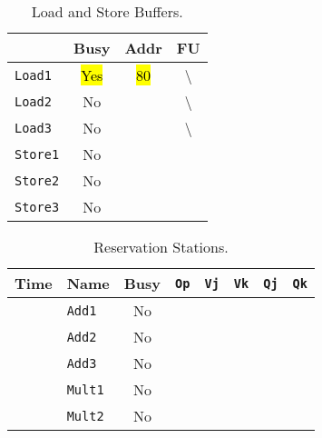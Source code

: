 \begin{enumerate}
    \newpage

    \begin{table}[!htp]
        \centering
        \begin{tabular}{@{} l | c c c @{}}
            \toprule
                                & Busy  & Addr   & FU   \\
            \midrule
            \texttt{Load1}      & \hl{Yes}  & \hl{80}   & \textbackslash    \\ [.3em]
            \texttt{Load2}      & No        &           & \textbackslash    \\ [.3em]
            \texttt{Load3}      & No        &           & \textbackslash    \\
            \cmidrule{1-4}
            \texttt{Store1}     & No        &           &                   \\ [.3em]
            \texttt{Store2}     & No        &           &                   \\ [.3em]
            \texttt{Store3}     & No        &           &                   \\
            \bottomrule
        \end{tabular}
        \caption*{Load and Store Buffers.}
    \end{table}

    \begin{table}[!htp]
        \centering
        \begin{tabular}{@{} l l | c c c c c c @{}}
            \toprule
            Time        & Name              & Busy      & \texttt{Op}       & \texttt{Vj}       & \texttt{Vk}       & \texttt{Qj}       & \texttt{Qk}       \\
            \midrule
                        & \texttt{Add1}     & No        &                   &                   &                   &                   &                   \\ [.3em]
                        & \texttt{Add2}     & No        &                   &                   &                   &                   &                   \\ [.3em]
                        & \texttt{Add3}     & No        &                   &                   &                   &                   &                   \\ [.3em]
                        & \texttt{Mult1}    & No        &                   &                   &                   &                   &                   \\ [.3em]
                        & \texttt{Mult2}    & No        &                   &                   &                   &                   &                   \\
            \bottomrule
        \end{tabular}
        \caption*{Reservation Stations.}
    \end{table}


\end{enumerate}
